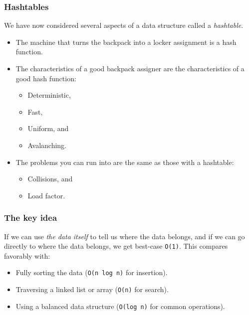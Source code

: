 \documentclass[aspectratio=169]{beamer}
\begin{document}
\begin{frame}
    \frametitle{Hashtables}
    We have now considered several aspects of a data structure called a
    \emph{hashtable}.

    \vspace{1em}

    \begin{itemize}
        \item The machine that turns the backpack into a locker assignment is
              a hash function.
        \item The characteristics of a good backpack assigner are the
              characteristics of a good hash function:
              \begin{itemize}
                  \item Deterministic,
                  \item Fast,
                  \item Uniform, and
                  \item Avalanching.
              \end{itemize}
        \item The problems you can run into are the same as those with a hashtable:
              \begin{itemize}
                  \item Collisions, and
                  \item Load factor.
              \end{itemize}
    \end{itemize}
\end{frame}

\begin{frame}
    \frametitle{The key idea}

    If we can use \emph{the data itself} to tell us where the data belongs,
    and if we can go directly to where the data belongs, we get best-case
    \texttt{O(1)}. This compares favorably with:

    \vspace{1em}

    \begin{itemize}
        \item Fully sorting the data (\texttt{O(n log n)} for insertion).
        \item Traversing a linked list or array (\texttt{O(n)} for search).
        \item Using a balanced data structure (\texttt{O(log n)} for common
              operations).
    \end{itemize}
\end{frame}
\end{document}

